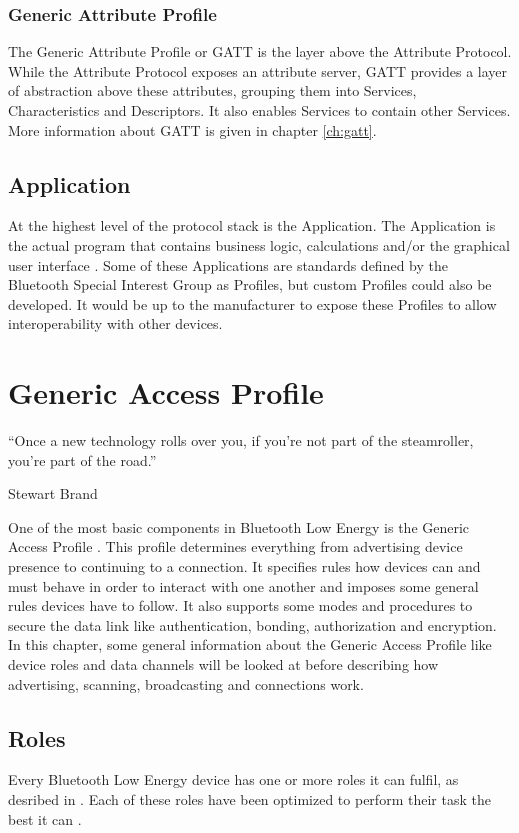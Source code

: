 \documentclass[pdftex,a4paper,12pt,twoside]{report}
\begin{document}
\subsection{Generic Attribute Profile}
\label{subsec:hostGATT}
The Generic Attribute Profile or GATT \citep{Townsend2014} is the layer above the Attribute Protocol. While the Attribute Protocol exposes an attribute server, GATT provides a layer of abstraction above these attributes, grouping them into Services, Characteristics and Descriptors. It also enables Services to contain other Services. More information about GATT is given in chapter \ref{ch:gatt}.

\section{Application}
\label{sec:stackApplication}
At the highest level of the protocol stack is the Application. The Application is the actual program that contains business logic, calculations and/or the graphical user interface \citep{Townsend2014}. Some of these Applications are standards defined by the Bluetooth Special Interest Group as Profiles, but custom Profiles could also be developed. It would be up to the manufacturer to expose these Profiles to allow interoperability with other devices.

\chapter{Generic Access Profile}
\label{ch:gap}
\epigraph{``Once a new technology rolls over you, if you’re not part of the steamroller, you’re part of the road.''}{Stewart Brand}
One of the most basic components in Bluetooth Low Energy is the Generic Access Profile \citep{heydon2012bluetooth}. This profile determines everything from advertising device presence to continuing to a connection. It specifies rules how devices can and must behave in order to interact with one another and imposes some general rules devices have to follow. It also supports some modes and procedures to secure the data link like authentication, bonding, authorization and encryption. In this chapter, some general information about the Generic Access Profile like device roles and data channels will be looked at before describing how advertising, scanning, broadcasting and connections work.

\section{Roles}
\label{sec:roles}
Every Bluetooth Low Energy device has one or more roles it can fulfil, as desribed in \cite{heydon2012bluetooth}. Each of these roles have been optimized to perform their task the best it can \citep{Townsend2014}.
\end{document}
